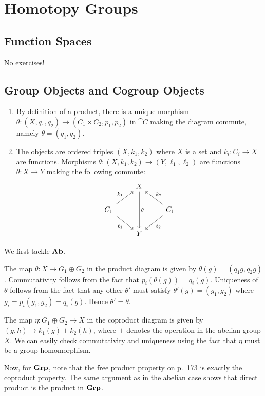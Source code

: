 \documentclass[../../solutions.tex]{subfiles}
\begin{document}
\section{Homotopy Groups}
\subsection{Function Spaces}
No exercises!

\subsection{Group Objects and Cogroup Objects}
\begin{exercise} \leavevmode
\begin{enumerate}
\item
By definition of a product, there is a unique morphism $\theta:(X,q_1,q_2)\to(C_1\times C_2,p_1,p_2)$ in $\cat C$ making the diagram commute, namely $\theta=(q_1,q_2)$.

\item
The objects are ordered triples $(X,k_1,k_2)$ where $X$ is a set and $k_i:C_i\to X$ are functions.
Morphisms $\theta:(X,k_1,k_2)\to(Y,\ell_1,\ell_2)$ are functions $\theta:X\to Y$ making the following commute:
\[
\begin{tikzcd}
& X \ar[dd,"\theta"] & \\
C_1 \ar[ur,"k_1"] \ar[dr,"\ell_1",swap] & & C_1 \ar[ul,"k_2",swap] \ar[dl,"\ell_2"] \\
& Y &
\end{tikzcd}
\]
\end{enumerate}
\end{exercise}

\begin{exercise} \leavevmode
We first tackle $\mathbf{Ab}$.

The map $\theta:X\to G_1\oplus G_2$ in the product diagram is given by $\theta(g)=(q_1g,q_2g)$.
Commutativity follows from the fact that $p_i(\theta(g))=q_i(g)$.
Uniqueness of $\theta$ follows from the fact that any other $\theta'$ must satisfy $\theta'(g)=(g_1,g_2)$ where $g_i=p_i(g_1,g_2)=q_i(g)$.
Hence $\theta'=\theta$.

The map $\eta:G_1\oplus G_2\to X$ in the coproduct diagram is given by $(g,h)\mapsto k_1(g)+k_2(h)$, where $+$ denotes the operation in the abelian group $X$.
We can easily check commutativity and uniqueness using the fact that $\eta$ must be a group homomorphism.

Now, for $\mathbf{Grp}$, note that the free product property on p.~173 is exactly the coproduct property.
The same argument as in the abelian case shows that direct product is the product in $\mathbf{Grp}$.
\end{exercise}
\end{document}
